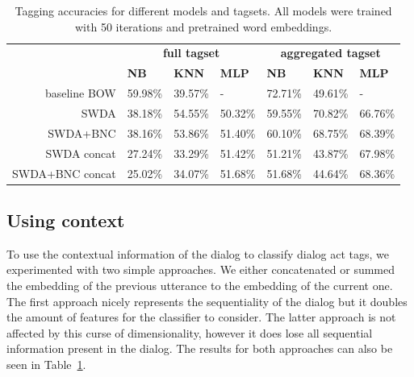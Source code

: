 \begin{table}[]
\centering
\begin{tabular}{r|lll|lll}
                   & \multicolumn{3}{c|}{\textbf{full tagset}} & \multicolumn{3}{c}{\textbf{aggregated tagset}} \\
                   & \textbf{NB}      & \textbf{KNN}     & \textbf{MLP}     & \textbf{NB}     & \textbf{KNN}     & \textbf{MLP}     \\
\hline
baseline BOW      & 59.98\%  & 39.57\% & -       & 72.71\%& 49.61\% &  -         \\
SWDA               & 38.18\%        & 54.55\%        &  50.32\%       &  59.55\%      &  70.82\%       &  66.76\%       \\
SWDA+BNC         & 38.16\%        &  53.86\%       &  51.40\%       &  60.10\%      &  68.75\%       &  68.39\%       \\
SWDA concat      & 27.24\%        & 33.29\%        &  51.42\%       & 51.21\%       &  43.87\%       &  67.98\%       \\
SWDA+BNC concat  & 25.02\%        & 34.07\%        &  51.68\%              & 51.68\%       & 44.64\%        & 68.36\%                \\
\end{tabular}
\caption{Tagging accuracies for different models and tagsets. All models were trained with 50 iterations and pretrained word embeddings.}
\label{tab:results}
\end{table}


\subsection{Using context}
To use the contextual information of the dialog to classify dialog act tags, we experimented with two simple approaches. We either concatenated or summed the embedding of the previous utterance to the embedding of the current one.
The first approach nicely represents the sequentiality of the dialog but it doubles the amount of features for the classifier to consider.
The latter approach is not affected by this curse of dimensionality, however it does lose all sequential information present in the dialog.
The results for both approaches can also be seen in Table~\ref{tab:results}.

